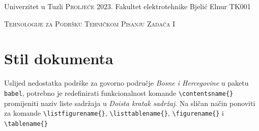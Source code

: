 \documentclass[a4paper, 10pt]{article}
\newcommand{\boldItalicColored}[2]{\color{#1}\textbf{\textsl{#2}}\color{black}}
\newcommand{\commandNameText}[1]{\texttt{\color{redBrick}\textbackslash#1\color{black}\{\}}}
\begin{document}
    \renewcommand{\contentsname}{Doista kratak sadržaj}
    \renewcommand{\listtablename}{Mala lista tabela}
    \renewcommand{\listfigurename}{Popis slika}

    \thispagestyle{prvaStranica}

    \noindent Univerzitet u Tuzli \hfill{\textsc{Proljeće 2023.}} \newline{}
    Fakultet elektrotehnike \hfill{Bjelić Elnur} \newline{}
    TK001 \newline{}
    \begin{center}
        \vspace{5mm}
        \begin{spacing}{1}
            \hspace{18pt}\LARGE{\textsc{Tehnologije za Podršku Tehničkom Pisanju}} \newline{}
            \LARGE{\textsc{Zadaća I  }}
        \end{spacing}
        \vspace{5mm}
        \begin{abstract}
            \boldItalicColored{black}{Prije svega }ovu zadaću ćete uraditi \boldItalicColored{redBrick}{sami bez varanja}, \boldItalicColored{black}{umjetne inteligencije i botova sa Interneta}. U okviru zadaće pokušat ćete domonstrirati svo stečeno znanje iz predmeta \textit{Tehnologije za podršku tehničkom pisanju} vezano za \LaTeX. Pažljivo analizirati dokument i replicirati sadržaj istog (stranice od 1 do 6). Obratiti pažnju na detalje u originalnom dokumentu te koristit pravila i principe \LaTeX-a za repliciranje istog. Vaš dokument mora biti \underline{vjerodostojna kopija} originalnom dokumentu (osim dijela prezime i ime, i broj indeksa). Kao rezultat, studenti će \boldItalicColored{orange}{predati kod } (*.tex i *.pdf file).
        \end{abstract}
    \end{center}
    \tableofcontents
    \listoffigures
    \listoftables
    \section{Stil dokumenta}
    Uslijed nedostatka podrške za govorno područje \textit{Bosne i Hercegovine} u paketu \texttt{babel}, potrebno je redefinirati funkcionalnost komande \commandNameText{contentsname} promijeniti naziv liste sadržaja u \textit{Doista kratak sadržaj}. Na sličan način ponoviti za komande \commandNameText{listfigurename}, \commandNameText{listtablename}, \commandNameText{figurename} i \commandNameText{tablename}
\end{document}

